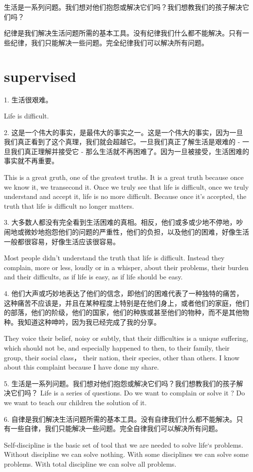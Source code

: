 \documentclass[UTF8]{article}
\begin{document}
生活是一系列问题。我们想对他们抱怨或解决它们吗？我们想教我们的孩子解决它们吗？

纪律是我们解决生活问题所需的基本工具。没有纪律我们什么都不能解决。只有一些纪律，我们只能解决一些问题。完全纪律我们可以解决所有问题。

\section{supervised}
\setlength{\baselineskip}{2cm}

1. 生活很艰难。

Life is difficult.

2. 这是一个伟大的事实，是最伟大的事实之一。这是一个伟大的事实，因为一旦我们真正看到了这个真理，我们就会超越它。一旦我们真正了解生活是艰难的 - 一旦我们真正理解并接受它 - 那么生活就不再困难了。因为一旦被接受，生活困难的事实就不再重要。

This is a great gruth, one of the greatest truths. It is a great truth because once we know it, we transecond it. Once we truly see that life is difficult, once we truly understand and accept it, life is no more difficult. Because once it's accepted, the truth that life is difficult no longer matters.

3. 大多数人都没有完全看到生活困难的真相。相反，他们或多或少地不停地，吵闹地或微妙地抱怨他们的问题的严重性，他们的负担，以及他们的困难，好像生活一般都很容易，好像生活应该很容易。

Most people didn't understand the truth that life is difficult. Instead they complain, more or less, loudly or in a whisper, about their problems, their burden and their difficults, as if life is easy, as if life should be easy.

4. 他们大声或巧妙地表达了他们的信念，即他们的困难代表了一种独特的痛苦，这种痛苦不应该是，并且在某种程度上特别是在他们身上，或者他们的家庭，他们的部落，他们的阶级，他们的国家，他们的种族或甚至他们的物种，而不是其他物种。我知道这种呻吟，因为我已经完成了我的分享。

They voice their belief, noisy or subtly, that their difficulties is a unique suffering, which should not be, and especially happened to then, to their family, their group, their social class， their nation, their species, other than others. I know 
about this complaint because I have done my share.

5. 生活是一系列问题。我们想对他们抱怨或解决它们吗？我们想教我们的孩子解决它们吗？
Life is a series of questions. Do we want to complain or solve it ? Do we want to teach our children the solution of it.

6. 自律是我们解决生活问题所需的基本工具。没有自律我们什么都不能解决。只有一些自律，我们只能解决一些问题。完全自律我们可以解决所有问题。

Self-discipline is the basic set of tool that we are needed to solve life‘s problems. 
Without discipline we can solve nothing. With some disciplines we can solve some problems. With total discipline we can solve all problems. 
\end{document}
